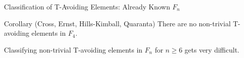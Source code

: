 \documentclass{beamer}
\newcommand\heapblock[4]{\fill[fill=#4, fill opacity=0.35, draw=#4, line width=1.1pt, rounded corners,shift={(\xxaxis:#1)},shift={(\yyaxis:#2)}] (-1,-1) rectangle (1,1);\node at (#1,#2) {\footnotesize $#3$};}
\newcommand\xxaxis{0}
\newcommand\yyaxis{90}
\begin{document}
\begin{frame}{Classification of T-Avoiding Elements: Already Known $F_n$}

\begin{block}{Corollary (Cross, Ernst, Hills-Kimball, Quaranta)}
There are no non-trivial T-avoiding elements in $F_4$.	
\end{block}
\pause

\begin{figure}\centering
{}
\end{figure}
Classifying non-trivial T-avoiding elements in $F_n$ for $n \geq 6$ gets very difficult.
\end{frame}




%
%


\end{document}
